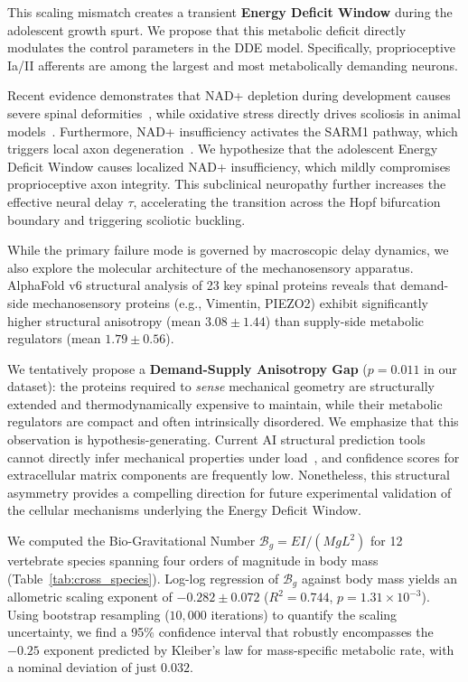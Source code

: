 \documentclass[11pt]{article}
\begin{document}
This scaling mismatch creates a transient \textbf{Energy Deficit Window} during the adolescent growth spurt. We propose that this metabolic deficit directly modulates the control parameters in the DDE model. Specifically, proprioceptive Ia/II afferents are among the largest and most metabolically demanding neurons.

Recent evidence demonstrates that NAD+ depletion during development causes severe spinal deformities~\cite{basse2021nampt}, while oxidative stress directly drives scoliosis in animal models~\cite{pumputis2025oxidative}. Furthermore, NAD+ insufficiency activates the SARM1 pathway, which triggers local axon degeneration~\cite{gerdts2015sarm1}. We hypothesize that the adolescent Energy Deficit Window causes localized NAD+ insufficiency, which mildly compromises proprioceptive axon integrity. This subclinical neuropathy further increases the effective neural delay $\tau$, accelerating the transition across the Hopf bifurcation boundary and triggering scoliotic buckling.



While the primary failure mode is governed by macroscopic delay dynamics, we also explore the molecular architecture of the mechanosensory apparatus. AlphaFold v6 structural analysis of 23 key spinal proteins reveals that demand-side mechanosensory proteins (e.g., Vimentin, PIEZO2) exhibit significantly higher structural anisotropy (mean $3.08 \pm 1.44$) than supply-side metabolic regulators (mean $1.79 \pm 0.56$).

We tentatively propose a \textbf{Demand-Supply Anisotropy Gap} ($p = 0.011$ in our dataset): the proteins required to \emph{sense} mechanical geometry are structurally extended and thermodynamically expensive to maintain, while their metabolic regulators are compact and often intrinsically disordered. We emphasize that this observation is hypothesis-generating. Current AI structural prediction tools cannot directly infer mechanical properties under load~\cite{gomes2022protein, zonta2024sequence}, and confidence scores for extracellular matrix components are frequently low. Nonetheless, this structural asymmetry provides a compelling direction for future experimental validation of the cellular mechanisms underlying the Energy Deficit Window.

We computed the Bio-Gravitational Number $\mathcal{B}_g = EI/(MgL^2)$ for 12 vertebrate species spanning four orders of magnitude in body mass (Table~\ref{tab:cross_species}). Log-log regression of $\mathcal{B}_g$ against body mass yields an allometric scaling exponent of $-0.282 \pm 0.072$ ($R^2 = 0.744$, $p = 1.31 \times 10^{-3}$). Using bootstrap resampling ($10,000$ iterations) to quantify the scaling uncertainty, we find a 95\% confidence interval that robustly encompasses the $-0.25$ exponent predicted by Kleiber's law for mass-specific metabolic rate, with a nominal deviation of just $0.032$.
\end{document}
